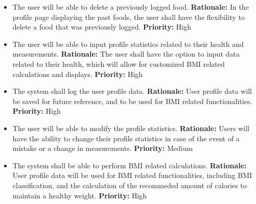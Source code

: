 \documentclass[12pt]{article}
\newcounter{FRCounter}
\newcommand{\FillFRNumber}{\textbf{FR\arabic{FRCounter}.} \stepcounter{FRCounter}}
\begin{document}
\begin{itemize}
	\item [\FillFRNumber] The user will be able to delete a previously logged food. \newline
	\textbf{Rationale:}  In the profile page displaying the past foods, the user shall have the flexibility to delete a food that was previously logged. \newline
	\textbf{Priority:} High
\end{itemize}

\begin{itemize}
	\item [\FillFRNumber] The user will be able to input profile statistics related to their health and measurements. \newline
	\textbf{Rationale:}  The user shall have the option to input data related to their health, which will allow for customized BMI related calculations and displays. \newline
	\textbf{Priority:} High
\end{itemize}

\begin{itemize}
	\item [\FillFRNumber] The system shall log the user profile data.\newline
	\textbf{Rationale:}  User profile data will be saved for future reference, and to be used for BMI related functionalities. \newline
	\textbf{Priority:} High
\end{itemize}

\begin{itemize}
	\item [\FillFRNumber] The user will be able to modify the profile statistics.\newline
	\textbf{Rationale:}  Users will have the ability to change their profile statistics in case of the event of a mistake or a change in measurements. \newline
	\textbf{Priority:} Medium
\end{itemize}

\begin{itemize}
	\item [\FillFRNumber] The system shall be able to perform BMI related calculations. \newline
	\textbf{Rationale:}  User profile data will be used for BMI related functionalities, including BMI classification, and the calculation of the recommeded amount of calories to maintain a healthy weight. \newline
	\textbf{Priority:} High
\end{itemize}
\end{document}
